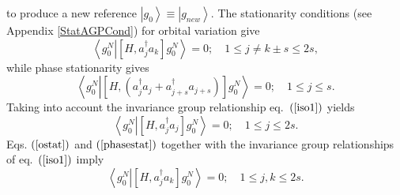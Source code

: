 \documentclass[aps,preprint]{revtex4}%
\begin{document}
to produce a new reference $\left\vert g_{0}\right\rangle \equiv\left\vert
g_{new}\right\rangle .$ The stationarity conditions (see Appendix
\ref{StatAGPCond}) for orbital variation give
\begin{equation}
\left\langle g_{0}^{N}\left\vert \left[  H,a_{j}^{\dagger}a_{k}\right]
g_{0}^{N}\right.  \right\rangle =0;\quad1\leq j\neq k\pm s\leq2s,
\label{ostat}%
\end{equation}
while phase stationarity gives%
\begin{equation}
\left\langle g_{0}^{N}\left\vert \left[  H,\left(  a_{j}^{\dagger}%
a_{j}+a_{j+s}^{\dagger}a_{j+s}\right)  \right]  g_{0}^{N}\right.
\right\rangle =0;\quad1\leq j\leq s.
\end{equation}
Taking into account the invariance group relationship eq.\ $\left(
\ref{iso1}\right)  $ yields
\begin{equation}
\left\langle g_{0}^{N}\left\vert \left[  H,a_{j}^{\dagger}a_{j}\right]
g_{0}^{N}\right.  \right\rangle =0;\quad1\leq j\leq2s. \label{phasestat}%
\end{equation}
Eqs. $\left(  \ref{ostat}\right)  $ and $\left(  \ref{phasestat}\right)  $
together with the invariance group relationships of eq.\ $\left(
\ref{iso1}\right)  $ imply
\begin{equation}
\left\langle g_{0}^{N}\left\vert \left[  H,a_{j}^{\dagger}a_{k}\right]
g_{0}^{N}\right.  \right\rangle =0;\quad1\leq j,k\leq2s. \label{orbstat}%
\end{equation}
\end{document}
